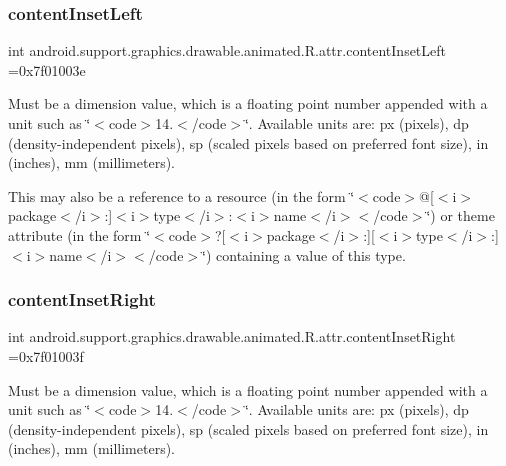 \subsubsection{\texorpdfstring{content\+Inset\+Left}{contentInsetLeft}}
{\footnotesize\ttfamily int android.\+support.\+graphics.\+drawable.\+animated.\+R.\+attr.\+content\+Inset\+Left =0x7f01003e\hspace{0.3cm}{\ttfamily [static]}}

Must be a dimension value, which is a floating point number appended with a unit such as \char`\"{}$<$code$>$14.\+5sp$<$/code$>$\char`\"{}. Available units are\+: px (pixels), dp (density-\/independent pixels), sp (scaled pixels based on preferred font size), in (inches), mm (millimeters). 

This may also be a reference to a resource (in the form \char`\"{}$<$code$>$@\mbox{[}$<$i$>$package$<$/i$>$\+:\mbox{]}$<$i$>$type$<$/i$>$\+:$<$i$>$name$<$/i$>$$<$/code$>$\char`\"{}) or theme attribute (in the form \char`\"{}$<$code$>$?\mbox{[}$<$i$>$package$<$/i$>$\+:\mbox{]}\mbox{[}$<$i$>$type$<$/i$>$\+:\mbox{]}$<$i$>$name$<$/i$>$$<$/code$>$\char`\"{}) containing a value of this type. \mbox{\label{classandroid_1_1support_1_1graphics_1_1drawable_1_1animated_1_1R_1_1attr_aa82bed4b60d6909d63985423f4e3ef56}} 
\subsubsection{\texorpdfstring{content\+Inset\+Right}{contentInsetRight}}
{\footnotesize\ttfamily int android.\+support.\+graphics.\+drawable.\+animated.\+R.\+attr.\+content\+Inset\+Right =0x7f01003f\hspace{0.3cm}{\ttfamily [static]}}

Must be a dimension value, which is a floating point number appended with a unit such as \char`\"{}$<$code$>$14.\+5sp$<$/code$>$\char`\"{}. Available units are\+: px (pixels), dp (density-\/independent pixels), sp (scaled pixels based on preferred font size), in (inches), mm (millimeters). 

